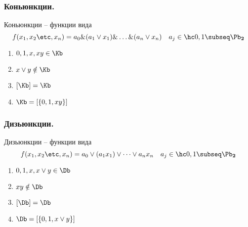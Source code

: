 \documentclass[unicode, 10pt, a4paper, oneside, fleqn]{article}
\begin{document}
\subsubsection{Коньюнкции.}
  \begin{df}
    Коньюнкции -- функции вида
    \begin{displaymath}
      f(\set[x]{n}) = a_0\&(a_1\vee x_1)\&\dots\&(a_n\vee x_n) \quad \pcoef 
    \end{displaymath}
  \end{df}
  \property
  \begin{enumerate}
    \item $0, 1, x, xy \in \Kb$
    \item $x\vee y\notin \Kb$
    \item $[\Kb] = \Kb $
    \item $\Kb = [\{0,1,xy\}]$
  \end{enumerate}
\subsubsection{Дизьюнкции.}
  \begin{df}
    Дизьюнкции -- функции вида
    \begin{displaymath}
      f(\set[x]{n}) = a_0\vee(a_1x_1)\vee\dots\vee a_nx_n \quad \pcoef 
    \end{displaymath}
  \end{df}
  \property
  \begin{enumerate}
    \item $0, 1, x, x\vee y \in \Db$
    \item $xy \notin \Db$
    \item $[\Db] = \Db $
    \item $\Db = [\{0, 1, x\vee y\}]$
  \end{enumerate}
\end{document}
